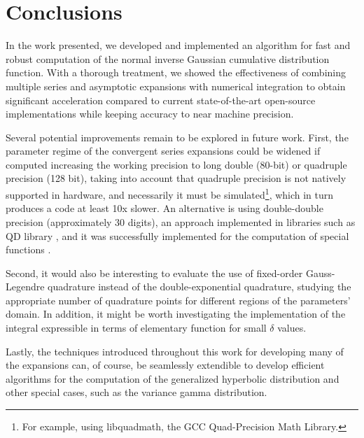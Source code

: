 \documentclass[10pt,a4paper,oneside]{article}
\numberwithin{equation}{section}
\begin{document}
\section{Conclusions}
In the work presented, we developed and implemented an algorithm for fast and robust computation of the normal inverse Gaussian cumulative distribution function.
With a thorough treatment, we showed the effectiveness of combining multiple series and asymptotic expansions with numerical integration to obtain significant
acceleration compared to current state-of-the-art open-source implementations while keeping accuracy to near machine precision.

Several potential improvements remain to be explored in future work. 
First, the parameter regime of the convergent series expansions could be widened if computed increasing the working precision to long double (80-bit) or quadruple precision (128 bit), taking into account that quadruple precision is not natively supported in hardware, and necessarily it must be simulated\footnote{For example, using libquadmath, the GCC Quad-Precision Math Library.}, which in turn produces a code at least 10x slower. An alternative is using double-double precision (approximately 30 digits), an approach implemented in libraries such as QD library \cite{Hida2001}, and it was successfully implemented for the computation of special functions \cite{Navas-Palencia2018a}. 

Second, it would also be interesting to evaluate the use of fixed-order Gauss-Legendre quadrature instead of the double-exponential quadrature, studying the appropriate number of quadrature points for different regions of the parameters' domain. In addition, it might be worth investigating the implementation of the integral expressible in terms of elementary function for small $\delta$ values. 


Lastly, the techniques introduced throughout this work for developing many of the expansions can, of course, be seamlessly extendible to develop efficient algorithms for the computation of the generalized hyperbolic distribution and other special cases, such as the variance gamma distribution.
\end{document}
